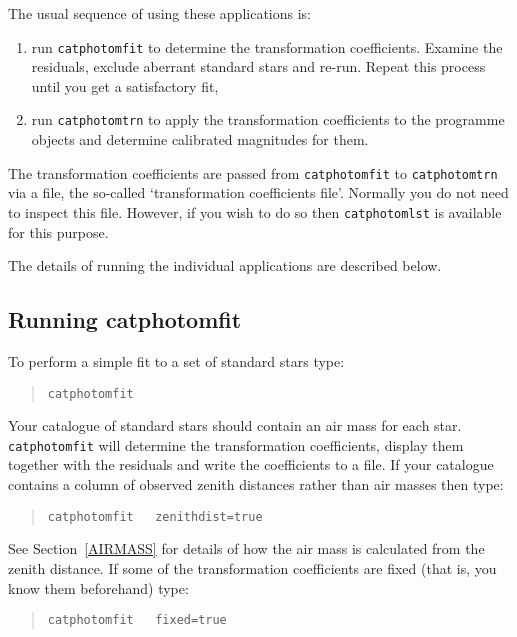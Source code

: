 \documentclass[twoside,11pt]{article}
\renewcommand{\_}{\texttt{\symbol{95}}}
\begin{document}
The usual sequence of using these applications is:

\begin{enumerate}

  \item run {\tt catphotomfit} to determine the transformation
   coefficients.  Examine the residuals, exclude aberrant standard
   stars and re-run.  Repeat this process until you get a satisfactory
   fit,

  \item run {\tt catphotomtrn} to apply the transformation coefficients
   to the programme objects and determine calibrated magnitudes for
   them.

\end{enumerate}

The transformation coefficients are passed from {\tt catphotomfit} to
{\tt catphotomtrn} via a file, the so-called `transformation
coefficients file'.  Normally you do not need to inspect this file.
However, if you wish to do so then {\tt catphotomlst} is available
for this purpose.

The details of running the individual applications are described below.

\subsection{Running catphotomfit}

To perform a simple fit to a set of standard stars type:

\begin{verse}
{\tt catphotomfit}
\end{verse}

Your catalogue of standard stars should contain an air mass for each
star.  {\tt catphotomfit} will determine the transformation coefficients,
display them together with the residuals and write the coefficients
to a file.  If your catalogue contains a column of observed zenith
distances rather than air masses then type:

\begin{verse}
{\tt catphotomfit ~ zenithdist=true}
\end{verse}

See Section~\ref{AIRMASS} for details of how the air mass is calculated
from the zenith distance.  If some of the transformation coefficients
are fixed (that is, you know them beforehand) type:

\begin{verse}
{\tt catphotomfit ~ fixed=true}
\end{verse}
\end{document}
